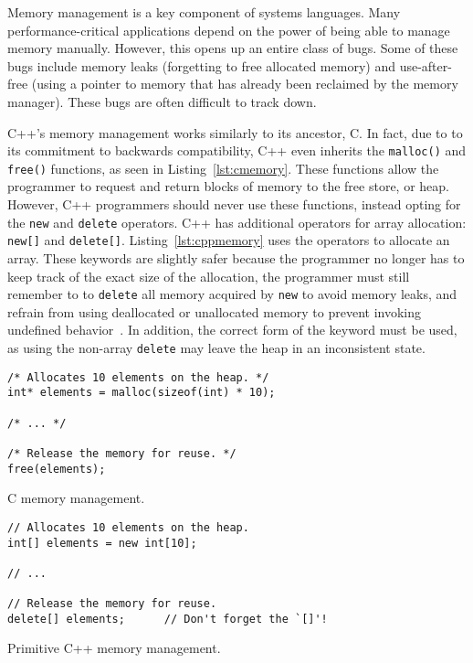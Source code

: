 \documentclass[finalcopy]{srpaper}
\begin{document}
Memory management is a key component of systems languages. Many
performance-critical applications depend on the power of being able to manage
memory manually. However, this opens up an entire class of bugs. Some of these
bugs include memory leaks (forgetting to free allocated memory) and
use-after-free (using a pointer to memory that has already been reclaimed by
the memory manager). These bugs are often difficult to track down.

C++'s memory management works similarly to its ancestor, C. In fact, due to to
its commitment to backwards compatibility, C++ even inherits the
\texttt{malloc()} and \texttt{free()} functions, as seen in
Listing~\ref{lst:cmemory}. These functions allow the programmer to request and
return blocks of memory to the free store, or heap. However, C++ programmers
should never use these functions, instead opting for the \texttt{new} and
\texttt{delete} operators. C++ has additional operators for array allocation:
\texttt{new[]} and \texttt{delete[]}. Listing~\ref{lst:cppmemory} uses the
operators to allocate an array. These keywords are slightly safer because the
programmer no longer has to keep track of the exact size of the allocation, the
programmer must still remember to to \texttt{delete} all memory acquired by
\texttt{new} to avoid memory leaks, and refrain from using deallocated or
unallocated memory to prevent invoking undefined
behavior~\cite{stroustrup2013the}. In addition, the correct form of the keyword
must be used, as using the non-array \texttt{delete} may leave the heap in an
inconsistent state.

\begin{listing}[H]
\begin{verbatim}
/* Allocates 10 elements on the heap. */
int* elements = malloc(sizeof(int) * 10);

/* ... */

/* Release the memory for reuse. */
free(elements);
\end{verbatim}
\caption{C memory management.}
\label{lst:cmemory}
\end{listing}

\begin{listing}[H]
\begin{verbatim}
// Allocates 10 elements on the heap.
int[] elements = new int[10];

// ...

// Release the memory for reuse.
delete[] elements;      // Don't forget the `[]'!
\end{verbatim}
\caption{Primitive C++ memory management.}
\label{lst:cppmemory}
\end{listing}
\end{document}
